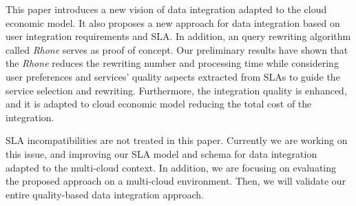 This paper introduces a new vision of data integration adapted to the cloud economic model. It also proposes a new approach for data integration based on user integration requirements and SLA. In addition, an query rewriting algorithm called \textit{Rhone} serves as proof of concept. Our preliminary results have shown that the \textit{Rhone} reduces the rewriting number and processing time while considering user preferences and services' quality aspects extracted from SLAs to guide the service selection and rewriting. Furthermore, the integration quality is enhanced, and it is adapted to cloud economic model reducing the total cost of the integration.

SLA incompatibilities are not treated in this paper. Currently we are working on this issue, and improving our SLA model and schema for data integration adapted to the multi-cloud context.  In addition, we are focusing on evaluating the proposed approach on a multi-cloud environment. Then, we will validate our entire quality-based data integration approach.